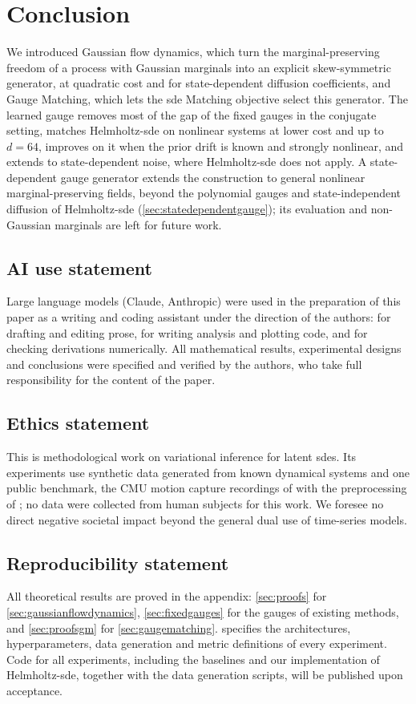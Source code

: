 \documentclass{article} %
\newif\ifpreprint
\begin{document}
\section{Conclusion}
We introduced Gaussian flow dynamics, which turn the marginal-preserving freedom of a process with Gaussian marginals into an explicit skew-symmetric generator, at quadratic cost and for state-dependent diffusion coefficients, and Gauge Matching, which lets the \gls{sde} Matching objective select this generator. The learned gauge removes most of the gap of the fixed gauges in the conjugate setting, matches Helmholtz-\gls{sde} on nonlinear systems at lower cost and up to $d = 64$, improves on it when the prior drift is known and strongly nonlinear, and extends to state-dependent noise, where Helmholtz-\gls{sde} does not apply. A state-dependent gauge generator extends the construction to general nonlinear marginal-preserving fields, beyond the polynomial gauges and state-independent diffusion of Helmholtz-\gls{sde} (\cref{sec:statedependentgauge}); its evaluation and non-Gaussian marginals are left for future work.

\ifpreprint\else
\subsection*{AI use statement}
Large language models (Claude, Anthropic) were used in the preparation of this paper as a writing and coding assistant under the direction of the authors: for drafting and editing prose, for writing analysis and plotting code, and for checking derivations numerically. All mathematical results, experimental designs and conclusions were specified and verified by the authors, who take full responsibility for the content of the paper.

\subsection*{Ethics statement}
This is methodological work on variational inference for latent \glspl{sde}. Its experiments use synthetic data generated from known dynamical systems and one public benchmark, the CMU motion capture recordings of \citet{gan2015deep} with the preprocessing of \citet{wang2007gaussian}; no data were collected from human subjects for this work. We foresee no direct negative societal impact beyond the general dual use of time-series models.

\subsection*{Reproducibility statement}
All theoretical results are proved in the appendix: \cref{sec:proofs} for \cref{sec:gaussianflowdynamics}, \cref{sec:fixedgauges} for the gauges of existing methods, and \cref{sec:proofsgm} for \cref{sec:gaugematching}.  specifies the architectures, hyperparameters, data generation and metric definitions of every experiment. Code for all experiments, including the baselines and our implementation of Helmholtz-\gls{sde}, together with the data generation scripts, will be published upon acceptance.
\end{document}
